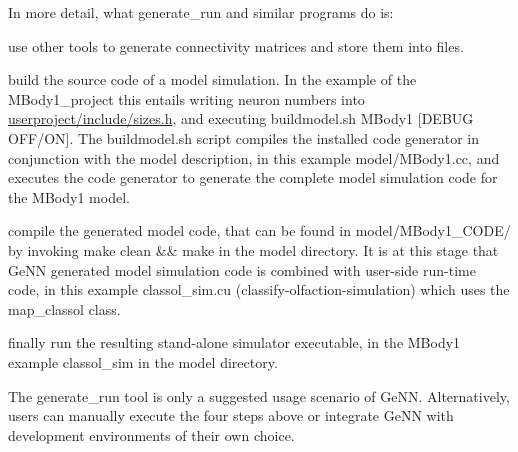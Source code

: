 In more detail, what {\ttfamily generate\+\_\+run} and similar programs do is\+:
\begin{DoxyEnumerate}
\item use other tools to generate connectivity matrices and store them into files.
\item build the source code of a model simulation. In the example of the M\+Body1\+\_\+project this entails writing neuron numbers into {\ttfamily \hyperlink{sizes_8h}{userproject/include/sizes.\+h}}, and executing {\ttfamily buildmodel.\+sh M\+Body1 \mbox{[}D\+E\+B\+U\+G O\+F\+F/\+O\+N\mbox{]}}. The {\ttfamily buildmodel.\+sh} script compiles the installed code generator in conjunction with the model description, in this example {\ttfamily model/\+M\+Body1.\+cc}, and executes the code generator to generate the complete model simulation code for the M\+Body1 model.
\item compile the generated model code, that can be found in {\ttfamily model/\+M\+Body1\+\_\+\+C\+O\+D\+E/} by invoking {\ttfamily make clean \&\& make} in the {\ttfamily model} directory. It is at this stage that Ge\+N\+N generated model simulation code is combined with user-\/side run-\/time code, in this example {\ttfamily classol\+\_\+sim.\+cu} (classify-\/olfaction-\/simulation) which uses the {\ttfamily map\+\_\+classol} class.
\item finally run the resulting stand-\/alone simulator executable, in the M\+Body1 example {\ttfamily classol\+\_\+sim} in the {\ttfamily model} directory.
\end{DoxyEnumerate}

The {\ttfamily generate\+\_\+run} tool is only a suggested usage scenario of Ge\+N\+N. Alternatively, users can manually execute the four steps above or integrate Ge\+N\+N with development environments of their own choice.

